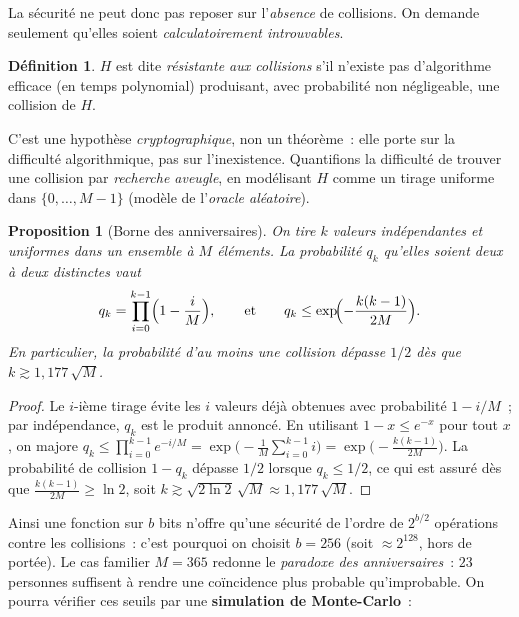 \documentclass[11pt,a4paper]{article}
\theoremstyle{definition}\newtheorem{definition}{Définition}
\theoremstyle{plain}\newtheorem{theoreme}{Théorème}\newtheorem{proposition}{Proposition}\newtheorem{lemme}{Lemme}
\theoremstyle{remark}\newtheorem{remarque}{Remarque}
\begin{document}
La sécurité ne peut donc pas reposer sur l'\emph{absence} de collisions. On demande seulement
qu'elles soient \emph{calculatoirement introuvables}.

\begin{definition}
$H$ est dite \emph{résistante aux collisions} s'il n'existe pas d'algorithme efficace (en temps
polynomial) produisant, avec probabilité non négligeable, une collision de $H$.
\end{definition}

C'est une hypothèse \emph{cryptographique}, non un théorème~: elle porte sur la difficulté
algorithmique, pas sur l'inexistence. Quantifions la difficulté de trouver une collision par
\emph{recherche aveugle}, en modélisant $H$ comme un tirage uniforme dans $\{0,\dots,M-1\}$
(modèle de l'\emph{oracle aléatoire}).

\begin{proposition}[Borne des anniversaires]\label{prop:birthday}
On tire $k$ valeurs indépendantes et uniformes dans un ensemble à $M$ éléments. La probabilité
$q_k$ qu'elles soient \emph{deux à deux distinctes} vaut
\[
  q_k = \prod_{i=0}^{k-1}\Bigl(1 - \frac{i}{M}\Bigr),
  \qquad\text{et}\qquad
  q_k \le \exp\!\Bigl(-\frac{k(k-1)}{2M}\Bigr).
\]
En particulier, la probabilité d'au moins une collision dépasse $1/2$ dès que
$k \gtrsim 1{,}177\,\sqrt{M}$.
\end{proposition}

\begin{proof}
Le $i$-ième tirage évite les $i$ valeurs déjà obtenues avec probabilité $1 - i/M$~; par
indépendance, $q_k$ est le produit annoncé. En utilisant $1 - x \le e^{-x}$ pour tout $x$, on
majore $q_k \le \prod_{i=0}^{k-1} e^{-i/M} = \exp\!\bigl(-\tfrac{1}{M}\sum_{i=0}^{k-1} i\bigr)
= \exp\!\bigl(-\tfrac{k(k-1)}{2M}\bigr)$. La probabilité de collision $1 - q_k$ dépasse $1/2$
lorsque $q_k \le 1/2$, ce qui est assuré dès que $\tfrac{k(k-1)}{2M} \ge \ln 2$, soit
$k \gtrsim \sqrt{2\ln 2}\,\sqrt{M} \approx 1{,}177\,\sqrt{M}$.
\end{proof}

Ainsi une fonction sur $b$ bits n'offre qu'une sécurité de l'ordre de $2^{b/2}$ opérations contre
les collisions~: c'est pourquoi on choisit $b = 256$ (soit $\approx 2^{128}$, hors de portée).
Le cas familier $M = 365$ redonne le \emph{paradoxe des anniversaires}~: $23$ personnes suffisent
à rendre une coïncidence plus probable qu'improbable. On pourra vérifier ces seuils par une
\textbf{simulation de Monte-Carlo}~:
\end{document}
